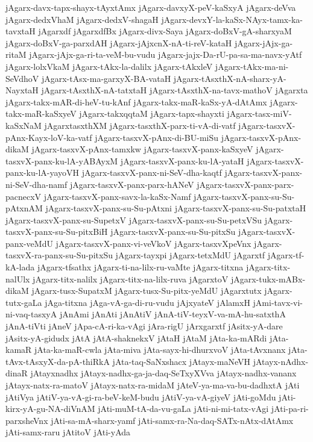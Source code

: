 {jAgarx-davx-tapx-shayx-tAyxtAmx
jAgarx-davxyX-peV-kaSxyA
jAgarx-deVva
jAgarx-dedxVhaM
jAgarx-dedxV-shagaH
jAgarx-devxY-la-kaSx-NAyx-tamx-ka-tavxtaH
jAgarxdf
jAgarxdfBx
jAgarx-divx-Saya
jAgarx-doBxV-gA-sharxyaM
jAgarx-doBxV-ga-parxdAH
jAgarx-jAjxcnX-nA-ti-reV-kataH
jAgarx-jAjx-ga-ritaM
jAgarx-jAjx-ga-ri-ta-veM-bu-vudu
jAgarx-jajx-Da-rU-pa-sa-ma-navx-yAtf
jAgarx-lolxVkaM
jAgarx-tAkx-la-dalilx
jAgarx-tAkxleV
jAgarx-tAkx-ma-ni-SeVdhoV
jAgarx-tAsx-ma-garxyX-BA-vataH
jAgarx-tAsxthX-nA-sharx-yA-NayxtaH
jAgarx-tAsxthX-nA-tatxtaH
jAgarx-tAsxthX-na-tavx-mathoV
jAgarxta
jAgarx-takx-mAR-di-heV-tu-kAnf
jAgarx-takx-maR-kaSx-yA-dAtAmx
jAgarx-takx-maR-kaSxyeV
jAgarx-takxqqtaM
jAgarx-tapx-shayxti
jAgarx-tasx-miV-kaSxNaM
jAgarxtasxthXM
jAgarx-tasxthX-parx-ti-vA-di-vatf
jAgarx-tasxvX-pAnx-Kayx-loV-ka-vatf
jAgarx-tasxvX-pAnx-di-BU-miSu
jAgarx-tasxvX-pAnx-dikaM
jAgarx-tasxvX-pAnx-tamxkw
jAgarx-tasxvX-panx-kaSxyeV
jAgarx-tasxvX-panx-ku-lA-yABAyxM
jAgarx-tasxvX-panx-ku-lA-yataH
jAgarx-tasxvX-panx-ku-lA-yayoVH
jAgarx-tasxvX-panx-ni-SeV-dha-kaqtf
jAgarx-tasxvX-panx-ni-SeV-dha-namf
jAgarx-tasxvX-panx-parx-hANeV
jAgarx-tasxvX-panx-parx-pacnecxV
jAgarx-tasxvX-panx-savx-la-kaSx-Namf
jAgarx-tasxvX-panx-su-Su-pAtxnAM
jAgarx-tasxvX-panx-su-Su-pAtxni
jAgarx-tasxvX-panx-su-Su-patxtaH
jAgarx-tasxvX-panx-su-SupetxV
jAgarx-tasxvX-panx-su-Su-petxVSu
jAgarx-tasxvX-panx-su-Su-pitxBiH
jAgarx-tasxvX-panx-su-Su-pitxSu
jAgarx-tasxvX-panx-veMdU
jAgarx-tasxvX-panx-vi-veVkoV
jAgarx-tasxvXpeVnx
jAgarx-tasxvX-ra-panx-su-Su-pitxSu
jAgarx-tayxpi
jAgarx-tetxMdU
jAgarxtf
jAgarx-tf-kA-lada
jAgarx-tfsathx
jAgarx-ti-na-lilx-ru-vaMte
jAgarx-titxna
jAgarx-titx-nalUlx
jAgarx-titx-nalilx
jAgarx-titx-na-lilx-ruva
jAgarxtoV
jAgarx-tukx-mABx-dikaM
jAgarx-tusx-SupatxM
jAgarx-tusx-Su-pitx-yeMdU
jAgarxtutx
jAgarx-tutx-gaLa
jAga-titxna
jAga-vA-ga-di-ru-vudu
jAjxyateV
jAlamxH
jAmi-tavx-vi-ni-vaq-tasxyA
jAnAmi
jAnAti
jAnAtiV
jAnA-tiV-teyxV-va-mA-hu-satxthA
jAnA-tiVti
jAneV
jApa-cA-ri-ka-vAgi
jAra-rigU
jArxgarxtf
jAsitx-yA-dare
jAsitx-yA-gidudx
jAtA
jAtA-shaknekxV
jAtaH
jAtaM
jAta-ka-mARdi
jAta-kamaR
jAta-ka-maR-cwla
jAta-miva
jAta-sayx-hi-dhurxvoV
jAta-tAvxnanx
jAta-tAvx-tAsxyX-da-pA-thiRkA
jAta-taq-SaNxshacx
jAtayx-maNeVH
jAtayx-nAdhx-dinaR
jAtayxnadhx
jAtayx-nadhx-ga-ja-daq-SeTxyXVva
jAtayx-nadhx-vananx
jAtayx-natx-ra-matoV
jAtayx-natx-ra-midaM
jAteV-ya-ma-va-bu-dadhxtA
jAti
jAtiVya
jAtiV-ya-vA-gi-ra-beV-keM-budu
jAtiV-ya-vA-giyeV
jAti-goMdu
jAti-kirx-yA-gu-NA-diVnAM
jAti-muM-tA-da-vu-gaLa
jAti-ni-mi-tatx-vAgi
jAti-pa-ri-parxsheVnx
jAti-sa-mA-sharx-yamf
jAti-samx-ra-Na-daq-SATx-nAtx-dAtAmx
jAti-samx-raru
jAtitoV
jAti-yAda
}
